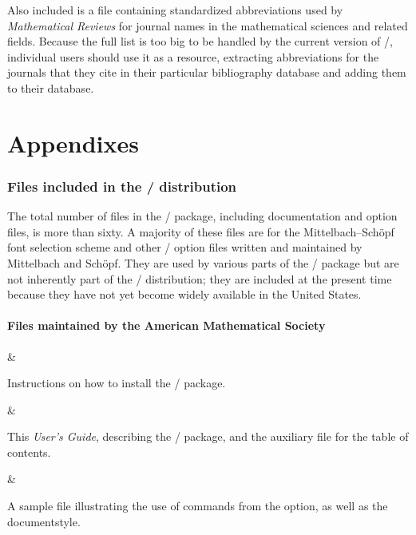 Also included is a file  containing  standardized
abbreviations used by {\it Mathematical Reviews\/} for journal names
in the mathematical sciences and related fields.
Because the full list is too big to be handled by the current
version of \bibtex/, individual users should use it as a resource,
extracting abbreviations for the journals
that they cite in their particular bibliography database
and adding them to their database.

\newpage
\part{Appendixes}
\appendix

\section{Files included in the \amslatex/ distribution}

The total number of files in the \amslatex/ package, including
documentation and option files, is more than sixty.
A majority of these files are for the
Mittelbach--Sch\"opf font selection scheme and other \latex/
option files written and maintained by Mittelbach and Sch\"opf.  They
are used by various parts of the \amslatex/ package but are not
inherently part of the \amslatex/ distribution; they are included at
the present time because they have not yet become widely available in
the United States.

\subsection{Files maintained by the American Mathematical Society}

\begin{filelist}
&

Instructions on how to install the \amslatex/ package.
\end{filelist}

\begin{filelist}
\newline{}&

This {\it User's Guide}, describing the \amslatex/ package, and the auxiliary
file for the table of contents.
\end{filelist}

\begin{filelist}
\newline {}\newline {}&

A sample file illustrating the use of commands from the 
option, as well as the  documentstyle.
\end{filelist}

